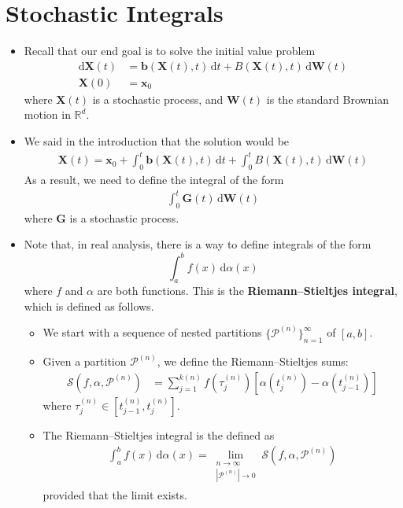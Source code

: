 \documentclass[10pt]{article}
\newcommand{\dee}{\mathrm{d}}
\newcommand{\ve}[1]{\mathbf{#1}}
\newcommand{\mcal}[1]{\mathcal{#1}}
\newcommand{\Real}{\mathbb{R}}
\begin{document}
\section{Stochastic Integrals}

\begin{itemize}
  \item Recall that our end goal is to solve the initial value problem
  \begin{align*}
    \dee\ve{X}(t) &= \ve{b}(\ve{X}(t), t)\, \dee t + B(\ve{X}(t), t)\, \dee\ve{W}(t) \\
    \ve{X}(0) &= \ve{x}_0
  \end{align*}
  where $\ve{X}(t)$ is a stochastic process, and $\ve{W}(t)$ is the standard Brownian motion in $\Real^d$.

  \item We said in the introduction that the solution would be
  \begin{align*}
    \ve{X}(t) = \ve{x}_0 + \int_0^t \ve{b}(\ve{X}(t), t)\, \dee t + \int_0^t B(\ve{X}(t), t)\, \dee\ve{W}(t)
  \end{align*}
  As a result, we need to define the integral of the form
  \begin{align*}
    \int_0^t \ve{G}(t)\, \dee\ve{W}(t)
  \end{align*}
  where $\ve{G}$ is a stochastic process.

  \item Note that, in real analysis, there is a way to define integrals of the form $$\int_a^b f(x)\, \dee \alpha(x)$$ where $f$ and $\alpha$ are both functions. This is the {\bf Riemann--Stieltjes integral}, which is defined as follows.
  
  \begin{itemize}
    \item We start with a sequence of nested partitions $\{ \mcal{P}^{(n)} \}_{n=1}^\infty$ of $[a,b]$.
    
    \item Given a partition $\mcal{P}^{(n)}$, we define the Riemann--Stieltjes sums: 
    \begin{align*}
      \mcal{S}(f, \alpha, \mcal{P}^{(n)}) &= \sum_{j=1}^{k(n)} f(\tau_j^{(n)}) [\alpha(t_j^{(n)}) - \alpha(t_{j-1}^{(n)})]
    \end{align*}
    where $\tau_j^{(n)} \in [t_{j-1}^{(n)}, t_{j}^{(n)}]$.
    
    \item The Riemann--Stieltjes integral is the defined as
    \begin{align*}
      \int_a^b f(x)\, \dee\alpha(x) = \lim_{\substack{ n \rightarrow \infty \\ |\mcal{P}^{(n)}| \rightarrow 0 }} \mcal{S}(f, \alpha, \mcal{P}^{(n)})
    \end{align*}
    provided that the limit exists.
  \end{itemize}


\end{itemize}
\end{document}
